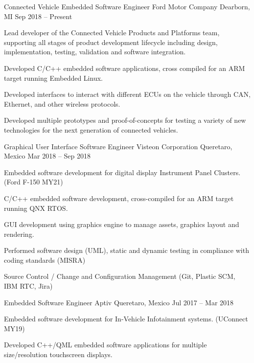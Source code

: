 \documentclass[]{awesome-cv}
\begin{document}
\vspace{-7mm}
\begin{cventries}
	\cventry
	{Connected Vehicle Embedded Software Engineer}
	{Ford Motor Company}
	{Dearborn, MI}
	{Sep 2018 – Present}
	{\begin{cvitems}
		\item {Lead developer of the Connected Vehicle Products and Platforms team, supporting all stages of product development lifecycle including design, implementation, testing, validation and software integration.}
		\item {Developed C/C++ embedded software applications, cross compiled for an ARM target running Embedded Linux.}
		\item {Developed interfaces to interact with different ECUs on the vehicle through CAN, Ethernet, and other wireless protocols.}
		\item {Developed multiple prototypes and proof-of-concepts for testing a variety of new technologies for the next generation of connected vehicles.}
		\end{cvitems}}
	\cventry
	{Graphical User Interface Software Engineer}
	{Visteon Corporation}
	{Queretaro, Mexico}
	{Mar 2018 – Sep 2018}
	{\begin{cvitems}
		\item {Embedded software development for digital display Instrument Panel Clusters. (Ford F-150 MY21)}
		\item {C/C++ embedded software development, cross-compiled for an ARM target running QNX RTOS.}
		\item {GUI development using graphics engine to manage assets, graphics layout and rendering.}
		\item {Performed software design (UML), static and dynamic testing in compliance with coding standards (MISRA)}
		\item {Source Control / Change and Configuration Management (Git, Plastic SCM, IBM RTC, Jira) }
		\end{cvitems}}
	\cventry
	{Embedded Software Engineer}
	{Aptiv}
	{Queretaro, Mexico}
	{Jul 2017 – Mar 2018}
	{\begin{cvitems}
		\item {Embedded software development for In-Vehicle Infotainment systems. (UConnect MY19)}
		\item {Developed C++/QML embedded software applications for multiple size/resolution touchscreen displays. 
}
\end{cvitems}}
\end{cventries}
\end{document}
